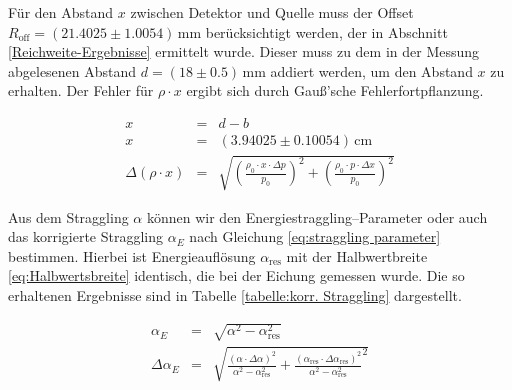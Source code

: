 \documentclass[12pt,a4paper]{scrartcl}
\numberwithin{equation}{section} %
\begin{document}
\noindent
Für den Abstand $x$ zwischen Detektor und Quelle muss der Offset $R_\mathrm{off}=(21.4025 \pm 1.0054) \mathrm{\,mm}$ berücksichtigt werden, der in Abschnitt \ref{Reichweite-Ergebnisse} ermittelt wurde. Dieser muss zu dem in der Messung abgelesenen Abstand $d=(18\pm0.5)\mathrm{\,mm}$ addiert werden, um den Abstand $x$ zu erhalten. Der Fehler für $\rho \cdot x$ ergibt sich durch Gauß'sche Fehlerfortpflanzung.

\begin{eqnarray}
	x &=& d-b\\
	x &=& (3.94025 \pm 0.10054)\mathrm{\,cm} \\
	\Delta (\rho \cdot x) &=& \sqrt{
			\left(\frac{\rho _0 \cdot x \cdot \Delta p}{p_0}\right)^2
			+ \left(\frac{\rho _0 \cdot p \cdot \Delta x}{p_0}\right)^2
		}
\end{eqnarray}

\noindent
Aus dem Straggling $\alpha$ können wir den Energiestraggling--Parameter oder auch das korrigierte Straggling $\alpha_E$ nach Gleichung \eqref{eq:straggling parameter} bestimmen. Hierbei ist Energieauflösung $\alpha _\mathrm{res}$ mit der Halbwertbreite \eqref{eq:Halbwertsbreite} identisch, die bei der Eichung gemessen wurde. Die so erhaltenen Ergebnisse sind in Tabelle \ref{tabelle:korr. Straggling} dargestellt.

\begin{eqnarray}
	\alpha _E&=& \sqrt{\alpha ^2 - \alpha_\mathrm{res}^2} \\
	\Delta \alpha _E&=& \sqrt{
		\frac{(\alpha\cdot\Delta\alpha)^2}{\alpha ^2 - \alpha_\mathrm{res}^2}
		+ \frac{(\alpha_\mathrm{res} \cdot \Delta \alpha_\mathrm{res})^2}{\alpha ^2 - \alpha_\mathrm{res}^2}^2
	}
\end{eqnarray}
\end{document}
